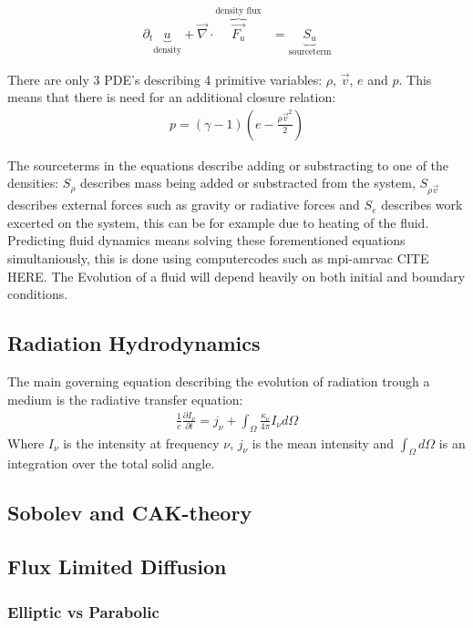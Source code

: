 \begin{align}
	\partial_t \underbrace{u}_\text{density} + \vec{\nabla} \cdot \overbrace{\vec{F_u}}^\text{density flux} &= \underbrace{S_u}_\text{sourceterm}
\end{align}

There are only 3 PDE's describing 4 primitive variables: $\rho$, $\vec{v}$, $e$ and $p$. This means that there is need for an additional closure relation:
\begin{align}
	p = (\gamma - 1) \left(e - \frac{\rho \vec{v}^2}{2} \right)
\end{align}

The sourceterms in the equations describe adding or substracting to one of the densities: $S_\rho$ describes mass being added or substracted from the system, $S_{\rho \vec{v}}$ describes external forces such as gravity or radiative forces and $S_e$ describes work excerted on the system, this can be for example due to heating of the fluid.\\

Predicting fluid dynamics means solving these forementioned equations simultaniously, this is done using computercodes such as mpi-amrvac CITE HERE. The Evolution of a fluid will depend heavily on both initial and boundary conditions.\\


\subsection{Radiation Hydrodynamics}
The main governing equation describing the evolution of radiation trough a medium is the radiative transfer equation:
\begin{align}
\frac{1}{c} \frac{\partial I_\nu}{\partial t} = j_\nu + \int_\Omega \frac{\kappa_\nu}{4 \pi} I_\nu d\Omega
\end{align}
Where $I_\nu$ is the intensity at frequency $\nu$, $j_\nu$ is the mean intensity and $\int_\Omega d\Omega$ is an integration over the total solid angle.


\subsection{Sobolev and CAK-theory}

\subsection{Flux Limited Diffusion}
\subsubsection{Elliptic vs Parabolic}